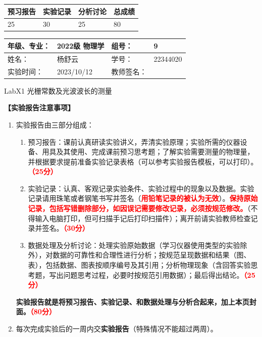 \documentclass[dvipsnames, svgnames,a4paper,11pt]{article}
\begin{document}
	
	
	
	\begin{table}
		\renewcommand\arraystretch{1.7}
		\begin{tabularx}{\textwidth}{
				|X|X|X|X
				|X|X|X|X|}
			\hline
			\multicolumn{2}{|c|}{预习报告}&\multicolumn{2}{|c|}{实验记录}&\multicolumn{2}{|c|}{分析讨论}&\multicolumn{2}{|c|}{总成绩}\\
			\hline
			\LARGE25 & & \LARGE30 & & \LARGE25 & & \LARGE80 & \\
			\hline
		\end{tabularx}
	\end{table}
	
	\begin{table}
		\renewcommand\arraystretch{1.7}
		\begin{tabularx}{\textwidth}{|X|X|X|X|}
			\hline
			年级、专业： & 2022级 物理学 &组号： & 9\\
			\hline
			姓名： & 杨舒云  & 学号： & 22344020\\
			\hline
			实验时间： & 2023/10/12 & 教师签名： & \\
			\hline
		\end{tabularx}
	\end{table}
	
	\begin{center}
		\LARGE LabX1 \quad 光栅常数及光波波长的测量
	\end{center}
	
	\textbf{【实验报告注意事项】}
	\begin{enumerate}
		\item 实验报告由三部分组成：
		\begin{enumerate}
			\item 预习报告：课前认真研读实验讲义，弄清实验原理；实验所需的仪器设备、用具及其使用、完成课前预习思考题；了解实验需要测量的物理量，并根据要求提前准备实验记录表格（可以参考实验报告模板，可以打印）。\textcolor{red}{\textbf{（25分）}}
			\item 实验记录：认真、客观记录实验条件、实验过程中的现象以及数据。实验记录请用珠笔或者钢笔书写并签名（\textcolor{red}{\textbf{用铅笔记录的被认为无效}}）。\textcolor{red}{\textbf{保持原始记录，包括写错删除部分，如因误记需要修改记录，必须按规范修改。}}（不得输入电脑打印，但可扫描手记后打印扫描件）；离开前请实验教师检查记录并签名。\textcolor{red}{\textbf{（30分）}}
			\item 数据处理及分析讨论：处理实验原始数据（学习仪器使用类型的实验除外），对数据的可靠性和合理性进行分析；按规范呈现数据和结果（图、表），包括数据、图表按顺序编号及其引用；分析物理现象（含回答实验思考题，写出问题思考过程，必要时按规范引用数据）；最后得出结论。\textcolor{red}{\textbf{（25分）}}
		\end{enumerate}
		\textbf{实验报告就是将预习报告、实验记录、和数据处理与分析合起来，加上本页封面。\textcolor{red}{（80分）}}
		\item 每次完成实验后的一周内交\textbf{实验报告}（特殊情况不能超过两周）。
	\end{enumerate}
	
\end{document}
